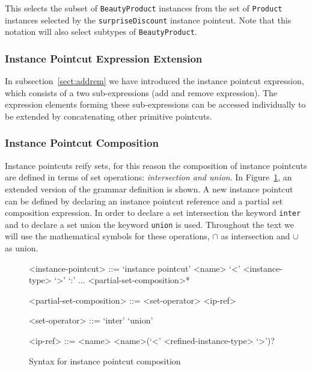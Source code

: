 \documentclass{acm_proc_article-sp}
\begin{document}
This selects the subset of \lstinline{BeautyProduct} instances from the set of \lstinline{Product} instances selected by the \lstinline{surpriseDiscount} instance pointcut. 
Note that this notation will also select subtypes of \lstinline{BeautyProduct}. 

\subsubsection{Instance Pointcut Expression Extension}
In subsection~\ref{sect:addrem} we have introduced the instance pointcut expression, which consists of a two sub-expressions (add and remove expression). The expression elements forming these sub-expressions can be accessed individually to be extended by concatenating other primitive pointcuts. 

\subsubsection{Instance Pointcut Composition}

Instance pointcuts reify sets, for this reason the composition of instance pointcuts are defined in terms of set operations: \emph{intersection and union}. 
In Figure~\ref{fig:grammar2}, an extended version of the grammar definition is shown. 
A new instance pointcut can be defined by declaring an instance pointcut reference and a partial set composition expression.  In order to declare a set intersection the keyword \texttt{inter} and to declare a set union the keyword \texttt{union} is used. Throughout the text we will use the mathematical symbols for these operations, $\cap$ as intersection and $\cup$ as union.

\begin{figure}[h]
\begin{grammar}
<instance-pointcut> ::= `instance pointcut' <name> `<' <instance-type> `>' `:'
...  <partial-set-composition>*

<partial-set-composition> ::= <set-operator> <ip-ref>

<set-operator> ::= `inter' \alt `union'

<ip-ref> ::= <name> \alt <name>(`<' <refined-instance-type> `>')?

\end{grammar}
\caption{Syntax for instance pointcut composition}
\label{fig:grammar2}
\end{figure}
\end{document}
